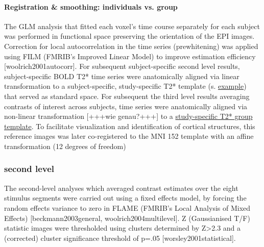 \documentclass[english]{article}
\begin{document}
\paragraph{Registration \& smoothing: individuals vs. group}
The GLM analysis that fitted each voxel's time course separately for each subject was performed in functional space preserving the orientation of the EPI images. Correction for local autocorrelation in the time series (prewhitening) was applied using FILM (FMRIB's Improved Linear Model) to improve estimation efficiency [woolrich2001autocorr].
For subsequent subject-specific second level results, subject-specific BOLD T2* time series were anatomically aligned via linear transformation to a subject-specific, study-specific T2* template (s. \href{"https://github.com/psychoinformatics-de/studyforrest-data-templatetransforms/blob/master/sub-01/bold3Tp2/brain.nii.gz"}{example}) that served as standard space.
For subsequent the third level results averaging contrasts of interest across subjects, time series were anatomically aligned via non-linear transformation [+++wie genau?+++] to a \href{"https://github.com/psychoinformatics-de/studyforrest-data-templatetransforms/blob/master/templates/grpbold3Tp2/brain.nii.gz"}{study-specific T2* group template}. To facilitate visualization and identification of cortical structures, this reference images was later co-registered to the MNI 152 template with an affine transformation (12 degrees of freedom)
\subsubsection{second level}
The second-level analyses which averaged contrast estimates over the eight stimulus segments were carried out using a fixed effects model, by forcing the random effects variance to zero in FLAME (FMRIB's Local Analysis of Mixed Effects) [beckmann2003general, woolrich2004multilevel]. Z (Gaussianised T/F) statistic images were thresholded using clusters determined by Z>2.3 and a (corrected) cluster significance threshold of p=.05 [worsley2001statistical].
\end{document}
